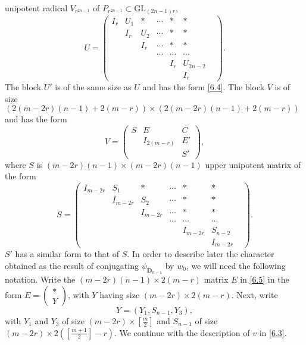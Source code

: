 \documentclass[12pts]{amsart}
\newcommand{\GL}{{\mathrm{GL}}}
\begin{document}
unipotent radical $V_{r^{2n-1}}$ of $P_{r^{2n-1}}\subset \GL_{(2n-1)r}$, 
\begin{equation}\label{6.4}
U=\begin{pmatrix}I_r&U_1&*&\cdots&*&*\\
&I_r&U_2&\cdots&*&*\\
& &I_r&\cdots &* & * \\
& & & \cdots& \cdots&\cdots &\\
& & &       &I_r&U_{2n-2}\\
& & &       & &I_r\end{pmatrix}.
\end{equation}
The block $U'$ is of the same size as $U$ and has the form
\eqref{6.4}. The block $V$ is of size $(2(m-2r)(n-1)+2(m-r))\times
(2(m-2r)(n-1)+2(m-r))$ and has the form 
\begin{equation}\label{6.5}
V=\begin{pmatrix}
S&E&C\\
&I_{2(m-r)}&E'\\
& &S'\end{pmatrix},
\end{equation}
where $S$ is $(m-2r)(n-1)\times (m-2r)(n-1)$ upper unipotent matrix of the
form
\begin{equation}\label{6.5.1}
S=\begin{pmatrix}I_{m-2r}&S_1&*&\cdots&*&*\\
&I_{m-2r}&S_2&\cdots&*&*\\
& &I_{m-2r}&\cdots &* & * \\
& & & \cdots& \cdots&\cdots &\\
& & &       &I_{m-2r}&S_{n-2}\\
& & &       & &I_{m-2r}\end{pmatrix}.
\end{equation}
$S'$ has a similar form to that of $S$. In order to describe later the
character obtained as the result of conjugating $\psi_{\mathbf{D}_{n-1}}$
by $w_0$, we will need the following notation. Write the
$(m-2r)(n-1)\times
2(m-r)$ matrix $E$ in \eqref{6.5} in the form $E=\begin{pmatrix}*\\
Y\end{pmatrix}$, with $Y$ having size $(m-2r)\times 2(m-r)$. Next,
write 
\begin{equation}\label{6.5.2}
Y=(Y_1,S_{n-1},Y_3), 
\end{equation}
with $Y_1$ and $Y_3$ of size $(m-2r)\times[\frac{m}{2}]$ and $S_{n-1}$ of size $(m-2r)\times2([\frac{m+1}{2}]-r)$. We continue with the description of $v$
in \eqref{6.3}.
\end{document}

